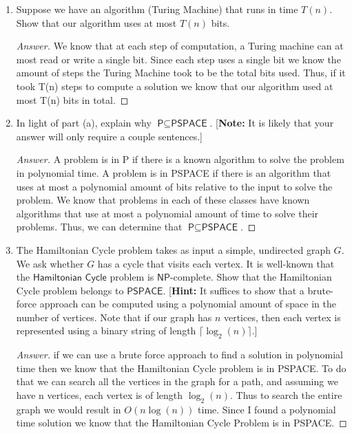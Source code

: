 \documentclass[11pt]{article}
\theoremstyle{definition}
\theoremstyle{definition}
\theoremstyle{definition}
\begin{document}
\begin{enumerate}[label=(\alph*)]
\item Suppose we have an algorithm (Turing Machine) that runs in time $T(n)$. Show that our algorithm uses at most $T(n)$ bits.

\begin{proof}[Answer]
We know that at each step of computation, a Turing machine can at most read or write a single bit. Since each step uses a single bit we know the amount of steps the Turing Machine took to be the total bits used. Thus, if it took T(n) steps to compute a solution we know that our algorithm used at most T(n) bits in total. 
\end{proof}


\vskip 15pt
\item In light of part (a), explain why $\textsf{P} \subseteq \textsf{PSPACE}$. [\textbf{Note:} It is likely that your answer will only require a couple sentences.]

\begin{proof}[Answer]

A problem is in P if there is a known algorithm to solve the problem in polynomial time. A problem is in PSPACE if there is an algorithm that uses at most a polynomial amount of bits relative to the input to solve the problem. We know that problems in each of these classes have known algorithms that use at most a polynomial amount of time to solve their problems. Thus, we can determine that $\textsf{P} \subseteq \textsf{PSPACE}$.
\end{proof}



\vskip 15pt
\item The \textsf{Hamiltonian Cycle} problem takes as input a simple, undirected graph $G$. We ask whether $G$ has a cycle that visits each vertex. It is well-known that the $\textsf{Hamiltonian Cycle}$ problem is $\textsf{NP}$-complete. Show that the \textsf{Hamiltonian Cycle} problem belongs to $\textsf{PSPACE}$. [\textbf{Hint:} It suffices to show that a brute-force approach can be computed using a polynomial amount of space in the number of vertices. Note that if our graph has $n$ vertices, then each vertex is represented using a binary string of length $\lceil \log_{2}(n) \rceil$.]

\begin{proof}[Answer]
if we can use a brute force approach to find a solution in polynomial time then we know that the Hamiltonian Cycle problem is in PSPACE. To do that we can search all the vertices in the graph for a path, and assuming we have n vertices, each vertex is of length $\log_2(n)$. Thus to search the entire graph we would result in $O(n\log(n))$ time. Since I found a polynomial time solution we know that the Hamiltonian Cycle Problem is in PSPACE.
  

\end{proof}
\end{enumerate}
\end{document}
